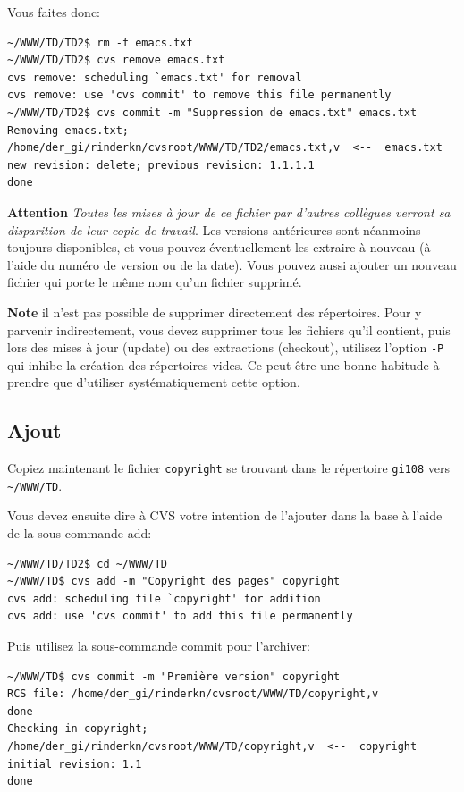 \documentclass[11pt,a4paper]{article}
\begin{document}
\noindent
Vous faites donc:

{\small
\begin{verbatim}
~/WWW/TD/TD2$ rm -f emacs.txt
~/WWW/TD/TD2$ cvs remove emacs.txt
cvs remove: scheduling `emacs.txt' for removal
cvs remove: use 'cvs commit' to remove this file permanently
~/WWW/TD/TD2$ cvs commit -m "Suppression de emacs.txt" emacs.txt
Removing emacs.txt;
/home/der_gi/rinderkn/cvsroot/WWW/TD/TD2/emacs.txt,v  <--  emacs.txt
new revision: delete; previous revision: 1.1.1.1
done
\end{verbatim}
}

\textbf{Attention} \emph{Toutes les mises à jour de ce fichier par
d'autres collègues verront sa disparition de leur copie de
travail}. Les versions antérieures sont néanmoins toujours
disponibles, et vous pouvez éventuellement les extraire à nouveau (à
l'aide du numéro de version ou de la date). Vous pouvez aussi ajouter
un nouveau fichier qui porte le même nom qu'un fichier supprimé.

\textbf{Note} il n'est pas possible de supprimer directement des
répertoires. Pour y parvenir indirectement, vous devez supprimer tous
les fichiers qu'il contient, puis lors des mises à jour
(\textsf{update}) ou des extractions (\textsf{checkout}), utilisez
l'option \texttt{-P} qui inhibe la création des répertoires vides. Ce
peut être une bonne habitude à prendre que d'utiliser systématiquement
cette option.

\subsection{Ajout}

Copiez maintenant le fichier \texttt{copyright} se trouvant dans le
répertoire \texttt{gi108} vers \verb|~/WWW/TD|.

Vous devez ensuite dire à CVS votre intention de l'ajouter
dans la base à l'aide de la sous-commande \textsf{add}:

{\small
\begin{verbatim}
~/WWW/TD/TD2$ cd ~/WWW/TD
~/WWW/TD$ cvs add -m "Copyright des pages" copyright
cvs add: scheduling file `copyright' for addition
cvs add: use 'cvs commit' to add this file permanently
\end{verbatim}
}

\noindent
Puis utilisez la sous-commande \textsf{commit} pour l'archiver:

{\small
\begin{verbatim}
~/WWW/TD$ cvs commit -m "Première version" copyright
RCS file: /home/der_gi/rinderkn/cvsroot/WWW/TD/copyright,v
done
Checking in copyright;
/home/der_gi/rinderkn/cvsroot/WWW/TD/copyright,v  <--  copyright
initial revision: 1.1
done
\end{verbatim}
}
\end{document}
